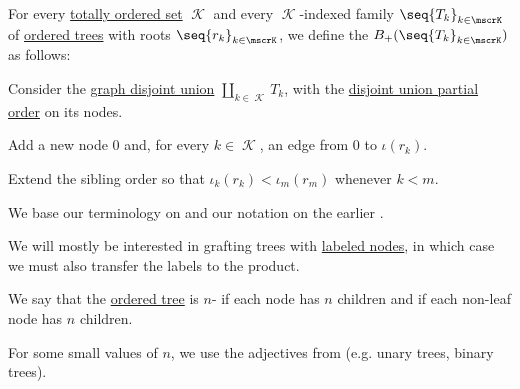 \begin{definition}\label{def:ordered_tree_grafting}\mimprovised
  For every \hyperref[def:totally_ordered_set]{totally ordered set} \( \mscrK \) and every \( \mscrK \)-indexed family \( \seq{ T_k }_{k \in \mscrK} \) of \hyperref[def:ordered_tree]{ordered trees} with roots \( \seq{ r_k }_{k \in \mscrK} \), we define the  \( B_+(\seq{ T_k }_{k \in \mscrK}) \) as follows:
  \begin{thmenum}
     Consider the \hyperref[def:graph_disjoint_union]{graph disjoint union} \( \coprod_{k \in \mscrK} T_k \), with the \hyperref[thm:order_category_isomorphism_properties/coproduct]{disjoint union partial order} on its nodes.

     Add a new node \( 0 \) and, for every \( k \in \mscrK \), an edge from \( 0 \) to \( \iota(r_k) \).

     Extend the sibling order so that \( \iota_k(r_k) < \iota_m(r_m) \) whenever \( k < m \).
  \end{thmenum}
\end{definition}
\begin{comments}
  \item We base our terminology on \cite[]{Holtkamp2011} and our notation on the earlier \cite[9]{Hoffman2002}.

  \item We will mostly be interested in grafting trees with \hyperref[def:labeled_set]{labeled nodes}, in which case we must also transfer the labels to the product.
\end{comments}

\begin{definition}\label{def:n_ary_tree}
  We say that the \hyperref[def:ordered_tree]{ordered tree} is \( n \)- if each node has  \( n \) children and  if each non-leaf node has  \( n \) children.

  For some small values of \( n \), we use the adjectives from  (e.g. unary trees, binary trees).
\end{definition}

